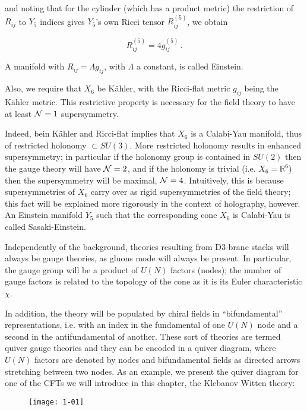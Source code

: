 and noting that for the cylinder (which has a product metric) the restriction of $R_{ij}$ to $Y_5$ indices gives $Y_5$'s own Ricci tensor $R_{ij}^{(5)}$, we obtain

\begin{equation}
	R^{(5)}_{ij} = 4 g_{ij}^{(5)}\,.
\end{equation}

A manifold with $R_{ij} = \Lambda g_{ij}$, with $\Lambda$ a constant, is called Einstein.

Also, we require that $X_6$ be K\"ahler, with the Ricci-flat metric $g_{ij}$ being the K\"ahler metric. This restrictive property is necessary\cite{KW_SCFT} for the field theory to have at least $\mathcal{N} = 1$ supersymmetry.

Indeed, bein K\"ahler and Ricci-flat implies that $X_6$ is a Calabi-Yau manifold, thus of restricted holonomy $\subset SU(3)$. More restricted holonomy results in enhanced supersymmetry; in particular if the holonomy group is contained in $SU(2)$ then the gauge theory will have $\mathcal{N} = 2$, and if the holonomy is trivial (i.e. $X_6 = \mathbb{R}^6$) then the supersymmetry will be maximal, $\mathcal{N} = 4$. Intuitively, this is because supersymmetries of $X_6$ carry over as rigid supersymmetries of the field theory; this fact will be explained more rigorously in the context of holography, however. An Einstein manifold $Y_5$ such that the corresponding cone $X_6$ is Calabi-Yau is called Sasaki-Einstein.

Independently of the background, theories resulting from D3-brane stacks will always be gauge theories, as gluons mode will always be present. In particular, the gauge group will be a product of $U(N)$ factors (nodes); the number of gauge factors is related to the topology of the cone as it is its Euler characteristic $\chi$.

In addition, the theory will be populated by chiral fields in ``bifundamental'' representations, i.e. with an index in the fundamental of one $U(N)$ node and a second in the antifundamental of another. These sort of theories are termed quiver gauge theories and they can be encoded in a quiver diagram, where $U(N)$ factors are denoted by nodes and bifundamental fields as directed arrows stretching between two nodes. As an example, we present the quiver diagram for one of the CFTs we will introduce in this chapter, the Klebanov Witten theory:

\begin{figure}[H]
	\centering
	\texttt{[image: 1-01]}
\end{figure}

